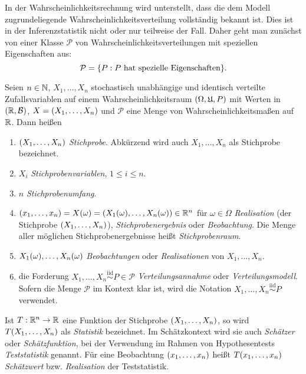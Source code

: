 \documentclass{lecture}
\begin{document}
    In der Wahrscheinlichkeitsrechnung wird unterstellt, dass die dem Modell zugrundeliegende Wahrscheinlichkeitsverteilung vollständig bekannt ist.
    Dies ist in der Inferenzstatistik nicht oder nur teilweise der Fall.
    Daher geht man zunächst von einer Klasse \(\mathcal{P}\) von Wahrscheinlichkeitsverteilungen mit speziellen Eigenschaften aus:
    \[
        \mathcal{P} = \braces*{P : P\text{ hat spezielle Eigenschaften}}.
    \]

    \begin{definition}
        Seien \(n \in \N\), \(X_1, \ldots, X_n\) stochastisch unabhängige und identisch verteilte Zufallsvariablen auf einem Wahrscheinlichkeitsraum \(\parentheses*{\Omega, \mathfrak{U}, P}\) mit Werten in \(\parentheses*{\R, \mathcal{B}}\), \(X = \parentheses*{X_1, \ldots, X_n}\) und \(\mathcal{P}\) eine Menge von Wahrscheinlichkeitsmaßen auf \(\R\).
        Dann heißen
        \begin{enumerate}
            \item \(\parentheses*{X_1, \ldots, X_n}\) \emph{Stichprobe}.
            Abkürzend wird auch \(X_1, \ldots, X_n\) als Stichprobe bezeichnet.
            \item \(X_i\) \emph{Stichprobenvariablen}, \(1 \le i \le n\).
            \item \(n\) \emph{Stichprobenumfang}.
            \item \(\parentheses*{x_1, \ldots, x_n} = X\parentheses*{\omega} = \parentheses*{X_1\parentheses*{\omega}, \ldots, X_n\parentheses*{\omega}} \in \R^n\) für \(\omega \in \Omega\) \emph{Realisation} (der Stichprobe \(\parentheses*{X_1, \ldots, X_n}\)), \emph{Stichprobenergebnis} oder \emph{Beobachtung}.
            Die Menge aller möglichen Stichprobenergebnisse heißt \emph{Stichprobenraum}.
            \item \(X_1\parentheses*{\omega}, \ldots, X_n\parentheses*{\omega}\) \emph{Beobachtungen} oder \emph{Realisationen} von \(X_1, \ldots, X_n\).
            \item die Forderung \(X_1, \ldots, X_n \stackrel{\text{iid}}{\sim} P \in \mathcal{P}\) \emph{Verteilungsannahme} oder \emph{Verteilungsmodell}.
            Sofern die Menge \(\mathcal{P}\) im Kontext klar ist, wird die Notation \(X_1, \ldots, X_n \stackrel{\text{iid}}{\sim} P\) verwendet.
        \end{enumerate}
        Ist \(T: \R^n \to \R\) eine Funktion der Stichprobe \(\parentheses*{X_1, \ldots, X_n}\), so wird \(T\parentheses*{X_1, \ldots, X_n}\) als \emph{Statistik} bezeichnet.
        Im Schätzkontext wird sie auch \emph{Schätzer} oder \emph{Schätzfunktion}, bei der Verwendung im Rahmen von Hypothesentests \emph{Teststatistik} genannt.
        Für eine Beobachtung \(\parentheses*{x_1, \ldots, x_n}\) heißt \(T\parentheses*{x_1, \ldots, x_n}\) \emph{Schätzwert} bzw. \emph{Realisation} der Teststatistik.
    \end{definition}
\end{document}

